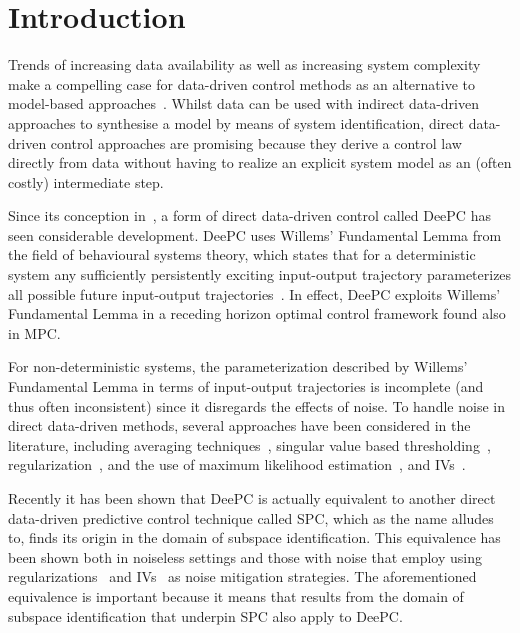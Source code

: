 \section{Introduction}
Trends of increasing data availability as well as increasing system complexity make a compelling case for data-driven control methods as an alternative to model-based approaches~\cite{Hou2013}. Whilst data can be used with indirect data-driven approaches to synthesise a model by means of system identification, direct data-driven control approaches are promising because they derive a control law directly from data without having to realize an explicit system model as an (often costly) intermediate step.

Since its conception in~\cite{Coulson2019}, a form of direct data-driven control called \ac{DeePC} has seen considerable development. \ac{DeePC} uses Willems' Fundamental Lemma from the field of behavioural systems theory, which states that for a deterministic system any sufficiently persistently exciting input-output trajectory parameterizes all possible future input-output trajectories~\cite{Willems2005}. In effect, \ac{DeePC} exploits Willems' Fundamental Lemma in a receding horizon optimal control framework found also in \ac{MPC}.

For non-deterministic systems, the parameterization described by Willems' Fundamental Lemma in terms of input-output trajectories is incomplete (and thus often inconsistent) since it disregards the effects of noise. To handle noise in direct data-driven methods, several approaches have been considered in the literature, including averaging techniques~\cite{Jo2022}, singular value based thresholding~\cite{Sassella2022}, regularization~\cite{Coulson2019}, and the use of maximum likelihood estimation~\cite{Yin2023}, and \ac{IVs}~\cite{vanWingerden2022}.

Recently it has been shown that \ac{DeePC} is actually equivalent to another direct data-driven predictive control technique called \ac{SPC}, which as the name alludes to, finds its origin in the domain of subspace identification. This equivalence has been shown both in noiseless settings and those with noise that employ using regularizations~\cite{Fiedler2021} and \ac{IVs}~\cite{vanWingerden2022} as noise mitigation strategies. The aforementioned equivalence is important because it means that results from the domain of subspace identification that underpin \ac{SPC} also apply to \ac{DeePC}.

